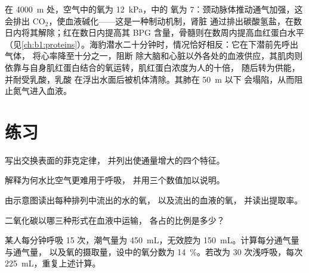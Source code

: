 \begin{example}[海拔与潜水]\label{ex:b1:gas-exchange:altitudediving}
在 \qty{4000}{m} 处，空气中的氧为 \qty{12}{kPa}，中的
氧为 \qty{7}{}：颈动脉体推动通气加强，这会排出 
$\mathrm{CO_2}$，使血液碱化——这是一种制动机制，肾脏
通过排出碳酸氢盐，在数日内将其解除；红在数日内提高其 
BPG 含量，骨髓则在数周内提高血红蛋白水平
（见\cref{ch:b1:proteins}）。海豹潜水二十分钟时，情况恰好相反：它在下潜前先呼出气体，
将心率降至十分之一，阻断
除大脑和心脏以外各处的血液供应，其肌肉则
依靠与自身肌红蛋白结合的氧运转，肌红蛋白浓度为人的十倍，
随后转为供能，并耐受乳酸，乳酸
在浮出水面后被机体清除。其肺在 \qty{50}{m} 以下
会塌陷，从而阻止氮气进入血液。
\end{example}

\section{练习}

\begin{exercise}[$\star$]\label{exo:b1:gas-exchange:1}
写出交换表面的菲克定律，
并列出使通量增大的四个特征。
\end{exercise}

\begin{exercise}[$\star$]\label{exo:b1:gas-exchange:2}
解释为何水比空气更难用于呼吸，
并用三个数值加以说明。
\end{exercise}

\begin{exercise}[$\star$]\label{exo:b1:gas-exchange:3}
由示意图读出每种排列中流出的水的氧，
以及流出的血液的氧，
并读出提取率。
\end{exercise}

\begin{exercise}[$\star$]\label{exo:b1:gas-exchange:4}
二氧化碳以哪三种形式在血液中运输，
各占的比例是多少？
\end{exercise}

\begin{exercise}[$\star\star$]\label{exo:b1:gas-exchange:5}
某人每分钟呼吸 \qty{15}{} 次，潮气量为
\qty{450}{mL}，无效腔为 \qty{150}{mL}。计算每分通气量与通气量，
以及氧的摄取量，设中的氧分数为 
\qty{14}{\%}。若改为 \qty{30}{} 次浅呼吸，每次 \qty{225}{mL}，重复上述计算。
\end{exercise}

